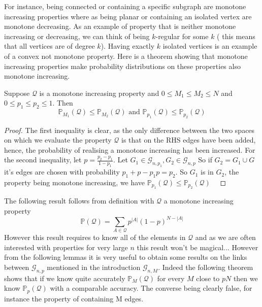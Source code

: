 For instance, being connected or containing a specific subgraph are monotone increasing properties where as being planar or containing an isolated vertex are monotone decreasing. 
As an example of property that is neither monotone increasing or decreasing, we can think of being $k$-regular for some $k$ ( this means that all vertices are of degree $k$).
Having exactly $k$ isolated vertices is an example of a convex not monotone property.
\newline
Here is a theorem showing that monotone increasing properties make probability distributions on these properties also monotone increasing.
\begin{theorem}
	Suppose $\mathcal{Q}$ is a monotone increasing property and $0 \leq M_1 \leq M_2 \leq N$ and $0 \leq p_1 \leq p_2 \leq 1$.
	\newline
	Then
	$$\mathbb{P}_{M_1}(\mathcal{Q}) \leq  \mathbb{P}_{M_2}(\mathcal{Q}) \text{  and  } \mathbb{P}_{p_1}(\mathcal{Q}) \leq \mathbb{P}_{p_2}(\mathcal{Q})$$
\end{theorem}
\begin{proof}
	The first inequality is clear, as the only difference between the two spaces on which we evaluate the property $\mathcal{Q}$ is that on the RHS edges have been added, hence, the probability of realising a monotone increasing has been increased.
	\newline
	For the second inequality, let $p = \frac{p_2 - p_1}{1 - p_1}$. Let $G_1 \in \mathcal{G}_{n, p_1}, G_2 \in \mathcal{G}_{n, p}$
	\newline
	So if $G_2 = G_1 \cup G$ it's edges are chosen with probability $p_1 + p - p_1 p = p_2$. So $G_1$ is in $G_2$, the property being monotone increasing, we have $ \mathbb{P}_{p_1}(\mathcal{Q}) \leq \mathbb{P}_{p_2}(\mathcal{Q})$
\
\end{proof}
The following result follows from definition with $\mathcal{Q}$ a monotone increasing property
\begin{equation}
	\mathbb{P}(\mathcal{Q}) = \sum_{A \in \mathcal{Q}} p^{|A|}(1-p)^{N-|A|}
\end{equation}
However this result requires to know all of the elements in $\mathcal{Q}$ and as we are often interested with properties for very large $n$ this result won't be magical... However from the following lemmas it is very useful to obtain some results on the links between $\mathcal{G}_{n, p}$ mentioned in the introduction $\mathcal{G}_{n, M}$.
Indeed the following theorem shows that if we know quite accurately $\mathbb{P}_M(\mathcal{Q})$ for every $M$ close to $pN$ then we know $\mathbb{P}_p(\mathcal{Q})$ with a comparable accuracy. The converse being clearly false, for instance the property of containing M edges.

